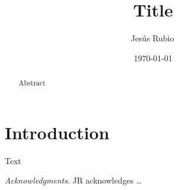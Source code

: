 \documentclass[
  aps,
  pra,
  reprint,
  superscriptaddress,
  nofootinbib
]{revtex4-2}
\begin{document}
\title{Title}

\author{Jes\'us Rubio\,}

\date{\today}

\begin{abstract}
Abstract
\end{abstract}

\maketitle

\section{Introduction}

Text

\bigskip

\emph{Acknowledgments}. JR acknowledges \dots


\end{document}
